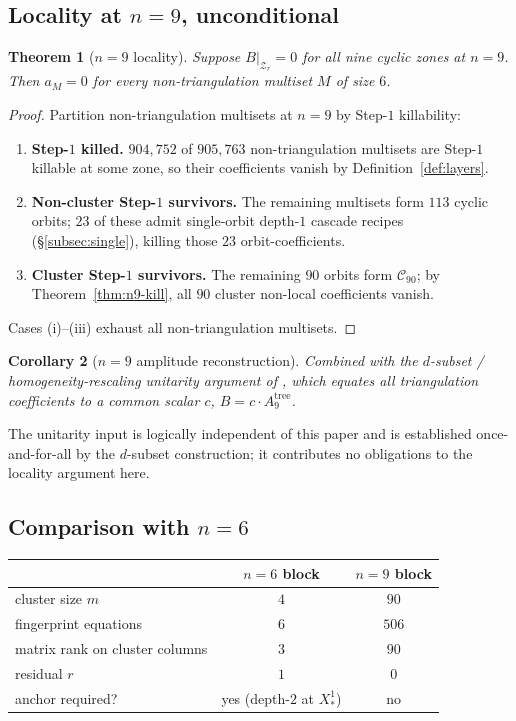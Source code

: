 \documentclass[11pt]{article}
\newtheorem{thm}{Theorem}
\newtheorem{cor}[thm]{Corollary}
\theoremstyle{definition}
\begin{document}
\subsection{Locality at $n=9$, unconditional}\label{subsec:locality}

\begin{thm}[$n=9$ locality]\label{thm:n9-locality}
Suppose $B\big|_{\mathcal Z_r}=0$ for all nine cyclic zones at
$n=9$. Then $a_M=0$ for every non-triangulation multiset $M$ of
size $6$.
\end{thm}

\begin{proof}
Partition non-triangulation multisets at $n=9$ by Step-$1$
killability:
\begin{enumerate}[label=(\roman*),leftmargin=2em]
\item \textbf{Step-$1$ killed.}
$904{,}752$ of $905{,}763$ non-triangulation multisets are
Step-$1$ killable at some zone, so their coefficients vanish by
Definition~\ref{def:layers}.
\item \textbf{Non-cluster Step-$1$ survivors.} The remaining
multisets form $113$ cyclic orbits; $23$ of these admit
single-orbit depth-$1$ cascade recipes (\S\ref{subsec:single}),
killing those $23$ orbit-coefficients.
\item \textbf{Cluster Step-$1$ survivors.}
The remaining $90$ orbits form $\mathcal C_{90}$; by
Theorem~\ref{thm:n9-kill}, all $90$ cluster non-local coefficients
vanish.
\end{enumerate}
Cases (i)--(iii) exhaust all non-triangulation multisets.
\end{proof}

\begin{cor}[$n=9$ amplitude reconstruction]\label{cor:n9}
Combined with the $d$-subset / homogeneity-rescaling unitarity
argument of \cite{notes18,subsetvan}, which equates all
triangulation coefficients to a common scalar $c$,
$B=c\cdot A_9^{\mathrm{tree}}$.
\end{cor}

The unitarity input is logically independent of this paper and is
established once-and-for-all by the $d$-subset construction; it
contributes no obligations to the locality argument here.

\subsection{Comparison with $n=6$}\label{subsec:compare}

\begin{center}
\begin{tabular}{lcc}
\toprule
& $n=6$ block & $n=9$ block\\
\midrule
cluster size $m$ & $4$ & $90$\\
fingerprint equations & $6$ & $506$\\
matrix rank on cluster columns & $3$ & $90$\\
residual $r$ & $1$ & $0$\\
anchor required? & yes (depth-$2$ at $X_*^{1}$) & no\\
\bottomrule
\end{tabular}
\end{center}
\end{document}
